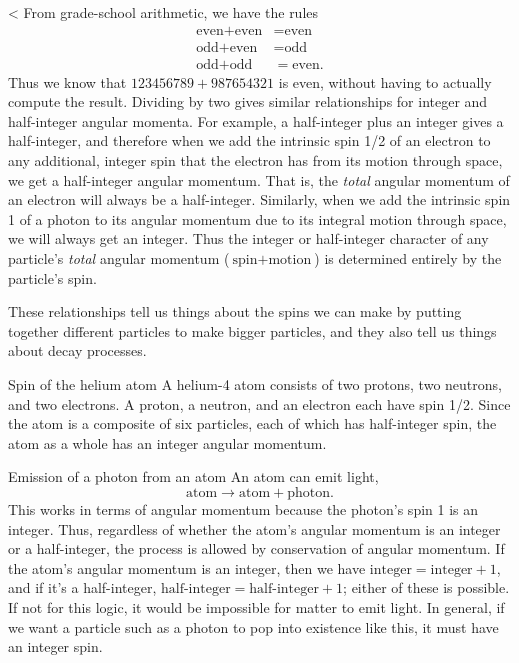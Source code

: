 <%
From grade-school arithmetic, we have the rules
\begin{align*}
  \text{even}+\text{even} &= \text{even} \\
  \text{odd}+\text{even} &= \text{odd} \\
  \text{odd}+\text{odd} &= \text{even}.
\end{align*}
Thus we know that $123456789+987654321$ is even, without having to actually compute the result.
Dividing by two gives similar relationships for integer and half-integer angular momenta.
For example, a half-integer plus an integer gives a half-integer, and therefore when we add
the intrinsic spin 1/2 of an electron to any additional, integer spin that the electron
has from its motion through space,
we get a half-integer angular momentum. That is, the \emph{total} angular momentum of an electron
will always be a half-integer. Similarly, when we add the intrinsic spin 1 of a photon to its
angular momentum due to its integral motion through space, we will always get an integer. Thus
the integer or half-integer character of any particle's \emph{total} angular momentum 
($\text{spin}+\text{motion}$) is determined entirely by the particle's spin.

These relationships tell us things about the spins we can make by putting together different
particles to make bigger particles, and they also tell us things about decay processes.

\begin{eg}{Spin of the helium atom}
A helium-4 atom consists of two protons, two neutrons, and two electrons.
A proton, a neutron, and an electron each have spin 1/2. Since the atom is
a composite of six particles, each of which has half-integer spin, the atom as
a whole has an integer angular momentum.
\end{eg}

\begin{eg}{Emission of a photon from an atom}
An atom can emit light,
\begin{equation*}
  \text{atom} \rightarrow \text{atom}+\text{photon}.
\end{equation*}
This works in terms of angular momentum because the photon's spin 1 is an integer.
Thus, regardless of whether the atom's angular momentum is an integer or a half-integer,
the process is allowed by conservation of angular momentum. If the atom's angular momentum
is an integer, then we have $\text{integer}=\text{integer}+1$, and if it's
a half-integer, $\text{half-integer}=\text{half-integer}+1$; either of these is possible.
If not for this logic, it would be impossible for matter to emit light. In general,
if we want a particle such as a photon to pop into existence like this, it must
have an integer spin.
\end{eg}

